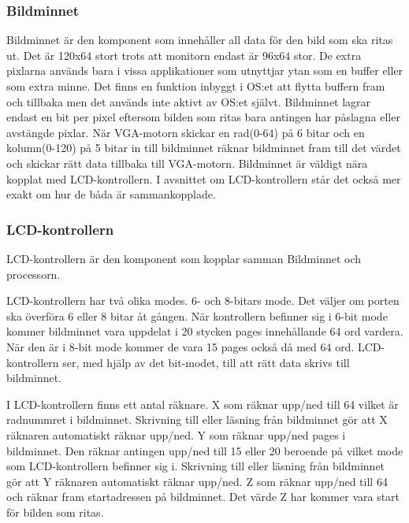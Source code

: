 \documentclass[main.tex]{subfiles}
\begin{document}
\subsubsection{Bildminnet}
Bildminnet är den komponent som innehåller all data för den bild som ska ritas
ut. Det är 120x64 stort trots att monitorn endast är 96x64 stor. De extra
pixlarna används bara i vissa applikationer som utnyttjar ytan som en buffer
eller som extra minne. Det finns en funktion inbyggt i OS:et att flytta buffern
fram och tillbaka men det används inte aktivt av OS:et självt. Bildminnet
lagrar endast en bit per pixel eftersom bilden som ritas bara antingen har
påslagna eller avstängde pixlar.  När VGA-motorn skickar en rad(0-64) på 6
bitar och en kolumn(0-120) på 5 bitar in till bildminnet räknar bildminnet fram
till det värdet och skickar rätt data tillbaka till VGA-motorn. Bildminnet är
väldigt nära kopplat med LCD-kontrollern. I avsnittet om LCD-kontrollern står
det också mer exakt om hur de båda är sammankopplade.

\subsubsection{LCD-kontrollern}
LCD-kontrollern är den komponent som kopplar samman Bildminnet och processorn.

LCD-kontrollern har två olika modes. 6- och 8-bitars mode. Det väljer om porten
ska överföra 6 eller 8 bitar åt gången. När kontrollern befinner sig i 6-bit
mode kommer bildminnet vara uppdelat i 20 stycken pages innehållande 64 ord
vardera. När den är i 8-bit mode kommer de vara 15 pages också då med 64 ord.
LCD-kontrollern ser, med hjälp av det bit-modet, till att rätt data skrivs till
bildminnet.

I LCD-kontrollern finns ett antal räknare.  X som räknar upp/ned till 64 vilket
är radnummret i bildminnet. Skrivning till eller läsning från bildminnet gör
att X räknaren automatiskt räknar upp/ned.  Y som räknar upp/ned pages i
bildminnet. Den räknar antingen upp/ned till 15 eller 20 beroende på vilket
mode som LCD-kontrollern befinner sig i. Skrivning till eller läsning från
bildminnet gör att Y räknaren automatiskt räknar upp/ned.  Z som räknar upp/ned
till 64 och räknar fram startadressen på bildminnet. Det värde Z har kommer
vara start för bilden som ritas.
\end{document}
